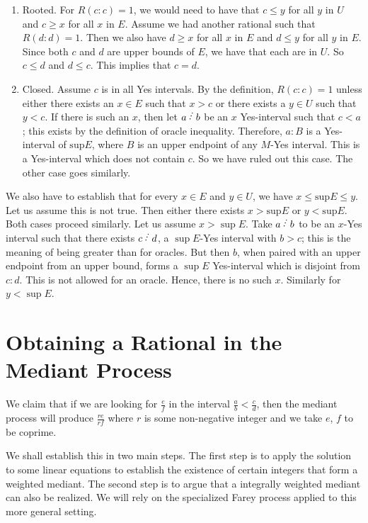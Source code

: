 \documentclass[12pt]{article}
\begin{document}
\begin{enumerate}
    \item Rooted. For $R(c:c)=1$, we would need to have that $c \leq y$ for all $y$ in $U$ and $c \geq x$ for all $x$ in $E$. Assume we had another rational such that $R(d:d) = 1$. Then we also have $d \geq x$ for all $x$ in $E$ and $d \leq y$ for all $y$ in $E$. Since both $c$ and $d$ are upper bounds of $E$, we have that each are in $U$. So $c \leq d$ and $d \leq c$. This implies that $c = d$. 
    \item Closed. Assume $c$ is in all Yes intervals. By the definition, $R(c:c) = 1$ unless either there exists an $x \in E$ such that $x> c$ or there exists a $y \in U$ such that $y < c$. If there is such an $x$, then let $a\lte b$ be an $x$ Yes-interval such that $c < a$; this exists by the definition of oracle inequality. Therefore, $a:B$ is a Yes-interval of $\mathrm{sup} E$, where $B$ is an upper endpoint of any $M$-Yes interval. This is a Yes-interval which does not contain $c$. So we have ruled out this case. The other case goes similarly.
\end{enumerate}

We also have to establish that for every $x \in E$ and $y \in U$, we have $x \leq \mathrm{sup} E \leq y$. Let us assume this is not true. Then either there exists $x > \mathrm{sup} E$ or $y < \mathrm{sup} E$. Both cases proceed similarly. Let us 
assume $ x > \sup E$. Take $a \lte b$ to be an $x$-Yes interval such that there exists $c \lte d$, a $\sup E$-Yes interval with $b > c$; this is the meaning of being greater than for oracles. But then $b$, when paired with an upper endpoint from an upper bound, forms a $\sup E$ Yes-interval which is disjoint from $c:d$. This is not allowed for an oracle. Hence, there is no such $x$. Similarly for $y < \sup E$. 

\section{Obtaining a Rational in the Mediant Process}\label{app:med}

We claim that if we are looking for $\frac{e}{f}$ in the interval $\frac{a}{b} \lt \frac{c}{d}$, then the mediant process will produce $\frac{re}{rf}$ where $r$ is some non-negative integer and we take $e$, $f$ to be coprime. 

We shall establish this in two main steps. The first step is to apply the solution to some linear equations to establish the existence of certain integers that form a weighted mediant. The second step is to argue that a integrally weighted mediant can also be realized.  We will rely on the specialized Farey process applied to this more general setting. 
\end{document}
